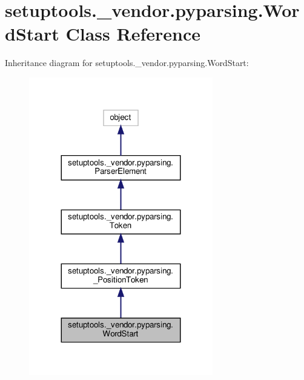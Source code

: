 \hypertarget{classsetuptools_1_1__vendor_1_1pyparsing_1_1WordStart}{}\section{setuptools.\+\_\+vendor.\+pyparsing.\+Word\+Start Class Reference}
\label{classsetuptools_1_1__vendor_1_1pyparsing_1_1WordStart}


Inheritance diagram for setuptools.\+\_\+vendor.\+pyparsing.\+Word\+Start\+:
\nopagebreak
\begin{figure}[H]
\begin{center}
\leavevmode
\includegraphics[width=227pt]{classsetuptools_1_1__vendor_1_1pyparsing_1_1WordStart__inherit__graph}
\end{center}
\end{figure}


